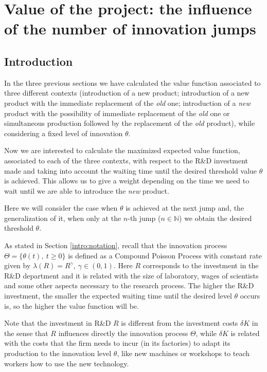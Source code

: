 \chapter{Value of the project: the influence of the number of innovation jumps}
\label{chapter:max}



\section{Introduction}
\label{section:max_intro}

In the three previous sections we have calculated the value function associated to three different contexts (introduction of a new product; introduction of a new product with the immediate replacement of the \textit{old} one; introduction of a \textit{new} product with the possibility of immediate replacement of the \textit{old} one or simultaneous production followed by the replacement of the \textit{old} product), while considering a fixed level of innovation $\theta$.

Now we are interested to calculate the maximized expected value function, associated to each of the three contexts, with respect to the R\&D investment made and taking into account the waiting time until the desired threshold value $\theta$ is achieved.
This allows us to give a weight depending on the time we need to wait until we are able to introduce the \textit{new} product.

Here we will consider the case when $\theta$ is achieved at the next jump and, the generalization of it, when only at the $n$-th jump ($n \in \mathds{N}$) we obtain the desired threshold $\theta$.



As stated in Section \ref{intro:notation}, recall that the innovation process $\Theta=\{ \theta(t), \ t \geq 0 \}$ is defined as a Compound Poisson Process with constant rate given by $\lambda(R)=R^\gamma, \ \gamma \in (0,1)$. 
Here $R$ corresponds to the investment in the R\&D department and it is related with the size of laboratory, wages of scientists and some other aspects necessary to the research process. The higher the R\&D investment, the smaller the expected waiting time until the desired level $\theta$ occurs is, so the higher the value function will be.

Note that the investment in R\&D $R$ is different from the investment costs $\delta K$ in the sense that $R$ influences directly the innovation process $\Theta$, %
while $\delta K$ is related with the costs that the firm needs to incur (in its factories) to adapt its production to the innovation level $\theta$, like new machines or workshops to teach workers how to use the new technology.



